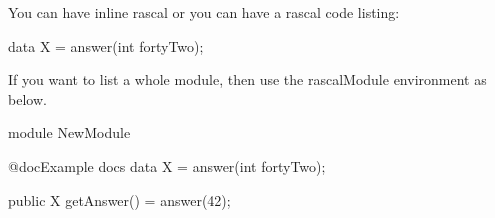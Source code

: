 \documentclass[]{article}
\begin{document}
	You can have inline rascal  or you can have a rascal
	code listing:

	\begin{rascal}
		data X = answer(int fortyTwo);
	\end{rascal}
			
	If you want to list a whole module, then use the rascalModule environment as
	below.

	\begin{rascalModule}
		module NewModule

		@doc{Example docs}
		data X = answer(int fortyTwo);

		public X getAnswer() = answer(42);
	\end{rascalModule}
	
\end{document}
